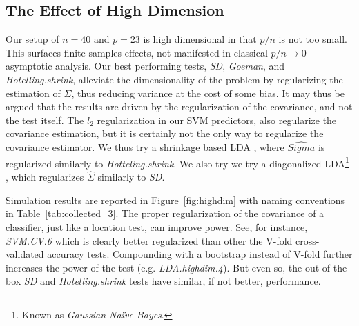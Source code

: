\documentclass[12pt,a4paper]{article}
\begin{document}
\subsection{The Effect of High Dimension}
\label{sec:highdim}

Our setup of $n=40$ and $p=23$ is high dimensional in that $p/n$ is not too small. 
This surfaces finite samples effects, not manifested in classical $p/n \to 0$ asymptotic analysis.
Our best performing tests, \emph{SD}, \emph{Goeman}, and \emph{Hotelling.shrink}, alleviate the dimensionality of the problem by regularizing the estimation of $\Sigma$, thus reducing variance at the cost of some bias. 
It may thus be argued that the results are driven by the regularization of the covariance, and not the test itself.
The $l_2$ regularization in our SVM predictors, also regularize the covariance estimation, but it is certainly not the only way to regularize the covariance estimator. 
We thus try a shrinkage based LDA \citep{pang_shrinkage-based_2009,ramey_high-dimensional_2016}, where $\hat{Sigma}$ is regularized similarly to \emph{Hotteling.shrink}.
We also try we try a diagonalized LDA\footnote{Known as \emph{Gaussian Na\"ive Bayes}.} \citep{dudoit_comparison_2002}, which regularizes $\hat{\Sigma}$ similarly to \emph{SD}.

Simulation results are reported in Figure~\ref{fig:highdim} with naming conventions in Table~\ref{tab:collected_3}.
The proper regularization of the covariance of a classifier, just like a location test, can improve power. 
See, for instance, \emph{SVM.CV.6} which is clearly better regularized than other the V-fold cross-validated accuracy tests. 
Compounding with a bootstrap instead of V-fold further increases the power of the test (e.g. \emph{LDA.highdim.4}).
But even so, the out-of-the-box \emph{SD} and \emph{Hotelling.shrink} tests have similar, if not better, performance. 

\bigskip
\end{document}
